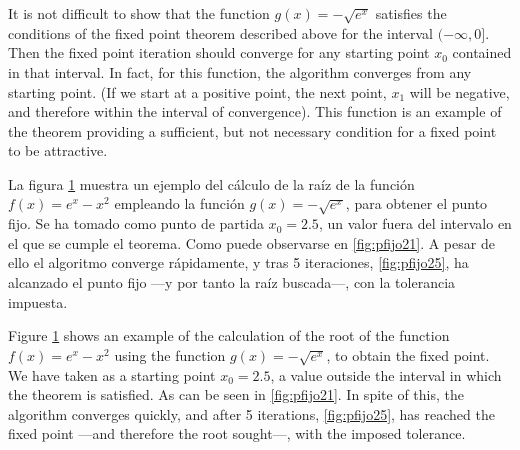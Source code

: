 \begin{paracol}{2}
It is not difficult to show that the function $g(x)=-\sqrt{e^x}$ satisfies the conditions of the fixed point theorem described above for the interval $(-\infty, 0]$. Then the fixed point iteration should converge for any starting point $x_0$ contained in that interval. In fact, for this function, the algorithm converges from any starting point. (If we start at a positive point, the next point, $x_1$ will be negative, and therefore within the interval of convergence). This function is an example of the theorem providing a sufficient, but not necessary condition for a fixed point to be attractive. 

\switchcolumn

La figura \ref{fig:pfijo2} muestra un ejemplo del cálculo de la raíz de la función $f(x)=e^x-x^2$ empleando la función $g(x)=-\sqrt{e^x}$, para obtener el punto fijo. Se ha tomado como punto de partida $x_0=2.5$, un valor fuera del intervalo en el que se cumple el teorema. Como puede observarse en \ref{fig:pfijo21}. A pesar de ello el algoritmo converge rápidamente, y tras 5 iteraciones, \ref{fig:pfijo25}, ha alcanzado el punto fijo ---y por tanto la raíz buscada---, con la tolerancia impuesta.

\switchcolumn

Figure \ref{fig:pfijo2} shows an example of the calculation of the root of the function $f(x)=e^x-x^2$ using the function $g(x)=-\sqrt{e^x}$, to obtain the fixed point. We have taken as a starting point $x_0=2.5$, a value outside the interval in which the theorem is satisfied. As can be seen in \ref{fig:pfijo21}. In spite of this, the algorithm converges quickly, and after 5 iterations, \ref{fig:pfijo25}, has reached the fixed point ---and therefore the root sought---, with the imposed tolerance.

\end{paracol}

\begin{figure}[h]
\centering
{} \qquad
{}\\
\qquad
{}\\
\qquad
{}

\label{fig:pfijo2}
\end{figure}

